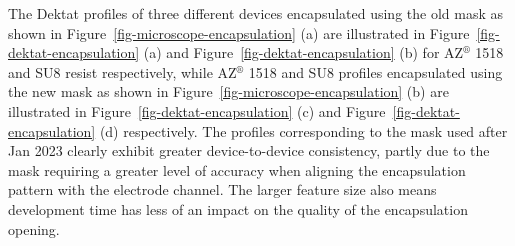 \documentclass[
  a4paper,
]{scrbook}
\begin{document}
The Dektat profiles of three different devices encapsulated using the
old mask as shown in Figure~\ref{fig-microscope-encapsulation} (a) are
illustrated in Figure~\ref{fig-dektat-encapsulation} (a) and
Figure~\ref{fig-dektat-encapsulation} (b) for AZ\(^\circledR\) 1518 and
SU8 resist respectively, while AZ\(^\circledR\) 1518 and SU8 profiles
encapsulated using the new mask as shown in
Figure~\ref{fig-microscope-encapsulation} (b) are illustrated in
Figure~\ref{fig-dektat-encapsulation} (c) and
Figure~\ref{fig-dektat-encapsulation} (d) respectively. The profiles
corresponding to the mask used after Jan 2023 clearly exhibit greater
device-to-device consistency, partly due to the mask requiring a greater
level of accuracy when aligning the encapsulation pattern with the
electrode channel. The larger feature size also means development time
has less of an impact on the quality of the encapsulation opening.
\end{document}
